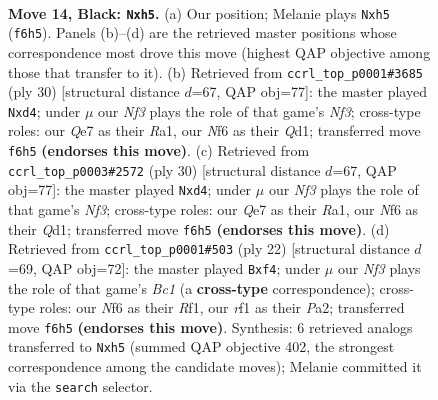 \documentclass[11pt]{article}
\begin{document}
\begin{figure}[p]
\label{fig:thought-m25}
\end{figure}

\clearpage

\begin{figure}[p]\centering
\begin{subfigure}{0.46\textwidth}\centering
\resizebox{\linewidth}{!}{%
\newchessgame
\chessboard[
  setfen={r1b2rk1/pp2q1pp/n2b1n2/P2p1p1P/8/1P2PNP1/5PB1/RNBQ1RK1 b - - 0 14},
  showmover=false,
  pgfstyle=straightmove, color=movearrow, markmove={f6-h5}
]}
\caption{}
\end{subfigure}\hfill
\begin{subfigure}{0.46\textwidth}\centering
\resizebox{\linewidth}{!}{%
\newchessgame
\chessboard[
  setfen={r2qr1k1/1b2bpp1/p2p1n1p/np6/3pP3/5NN1/PPB2PPP/R1BQR1K1 w - - 0 16},
  showmover=false,
  pgfstyle=straightmove, color=movearrow, markmove={f3-d4}
]}
\caption{}
\end{subfigure}
\\[4pt]
\begin{subfigure}{0.46\textwidth}\centering
\resizebox{\linewidth}{!}{%
\newchessgame
\chessboard[
  setfen={r2qr1k1/1b2bpp1/p2p1n1p/np6/3pP3/5NN1/PPB2PPP/R1BQR1K1 w - - 0 16},
  showmover=false,
  pgfstyle=straightmove, color=movearrow, markmove={f3-d4}
]}
\caption{}
\end{subfigure}\hfill
\begin{subfigure}{0.46\textwidth}\centering
\resizebox{\linewidth}{!}{%
\newchessgame
\chessboard[
  setfen={r1bq1rk1/p3bpp1/2pp1n1p/8/2B1Pp2/2N4P/PPP1Q1P1/R1B2RK1 w - - 0 12},
  showmover=false,
  pgfstyle=straightmove, color=movearrow, markmove={c1-f4}
]}
\caption{}
\end{subfigure}
\caption{\textbf{Move 14, Black: \texttt{Nxh5}.} (a) Our position; Melanie plays \texttt{Nxh5} (\texttt{f6h5}). Panels (b)--(d) are the retrieved master positions whose correspondence most drove this move (highest QAP objective among those that transfer to it). (b) Retrieved from \texttt{ccrl\_top\_p0001\#3685} (ply 30) [structural distance $d$=67, QAP obj=77]: the master played \texttt{Nxd4}; under $\mu$ our \emph{Nf3} plays the role of that game's \emph{Nf3}; cross-type roles: our \emph{Q}e7 as their \emph{R}a1, our \emph{N}f6 as their \emph{Q}d1; transferred move \texttt{f6h5} \textbf{(endorses this move)}. (c) Retrieved from \texttt{ccrl\_top\_p0003\#2572} (ply 30) [structural distance $d$=67, QAP obj=77]: the master played \texttt{Nxd4}; under $\mu$ our \emph{Nf3} plays the role of that game's \emph{Nf3}; cross-type roles: our \emph{Q}e7 as their \emph{R}a1, our \emph{N}f6 as their \emph{Q}d1; transferred move \texttt{f6h5} \textbf{(endorses this move)}. (d) Retrieved from \texttt{ccrl\_top\_p0001\#503} (ply 22) [structural distance $d$=69, QAP obj=72]: the master played \texttt{Bxf4}; under $\mu$ our \emph{Nf3} plays the role of that game's \emph{Bc1} (a \textbf{cross-type} correspondence); cross-type roles: our \emph{N}f6 as their \emph{R}f1, our \emph{r}f1 as their \emph{P}a2; transferred move \texttt{f6h5} \textbf{(endorses this move)}. Synthesis: 6 retrieved analogs transferred to \texttt{Nxh5} (summed QAP objective 402, the strongest correspondence among the candidate moves); Melanie committed it via the \texttt{search} selector.}

\end{figure}
\end{document}
